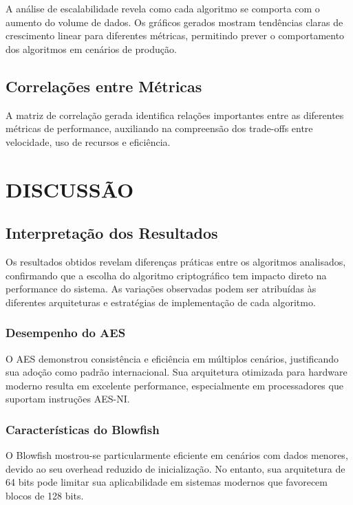 \documentclass[12pt,a4paper,oneside]{article}
\begin{document}
A análise de escalabilidade revela como cada algoritmo se comporta com o aumento do volume de dados. Os gráficos gerados mostram tendências claras de crescimento linear para diferentes métricas, permitindo prever o comportamento dos algoritmos em cenários de produção.

\subsection{Correlações entre Métricas}

A matriz de correlação gerada identifica relações importantes entre as diferentes métricas de performance, auxiliando na compreensão dos trade-offs entre velocidade, uso de recursos e eficiência.

\section{DISCUSSÃO}

\subsection{Interpretação dos Resultados}

Os resultados obtidos revelam diferenças práticas entre os algoritmos analisados, confirmando que a escolha do algoritmo criptográfico tem impacto direto na performance do sistema. As variações observadas podem ser atribuídas às diferentes arquiteturas e estratégias de implementação de cada algoritmo.

\subsubsection{Desempenho do AES}

O AES demonstrou consistência e eficiência em múltiplos cenários, justificando sua adoção como padrão internacional. Sua arquitetura otimizada para hardware moderno resulta em excelente performance, especialmente em processadores que suportam instruções AES-NI.

\subsubsection{Características do Blowfish}

O Blowfish mostrou-se particularmente eficiente em cenários com dados menores, devido ao seu overhead reduzido de inicialização. No entanto, sua arquitetura de 64 bits pode limitar sua aplicabilidade em sistemas modernos que favorecem blocos de 128 bits.
\end{document}

